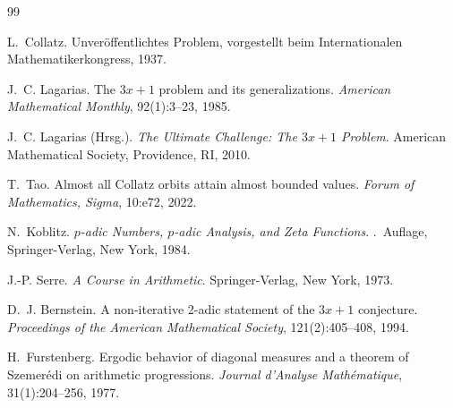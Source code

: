 \documentclass[12pt,a4paper]{article}
\begin{document}
\begin{thebibliography}{99}

L.~Collatz.
\newblock Unveröffentlichtes Problem, vorgestellt beim Internationalen Mathematikerkongress, 1937.

J.~C. Lagarias.
\newblock The $3x+1$ problem and its generalizations.
\newblock \emph{American Mathematical Monthly}, 92(1):3--23, 1985.

J.~C. Lagarias (Hrsg.).
\newblock \emph{The Ultimate Challenge: The $3x+1$ Problem}.
\newblock American Mathematical Society, Providence, RI, 2010.

T.~Tao.
\newblock Almost all Collatz orbits attain almost bounded values.
\newblock \emph{Forum of Mathematics, Sigma}, 10:e72, 2022.

N.~Koblitz.
\newblock \emph{$p$-adic Numbers, $p$-adic Analysis, and Zeta Functions}.
.\ Auflage, Springer-Verlag, New York, 1984.

J.-P. Serre.
\newblock \emph{A Course in Arithmetic}.
\newblock Springer-Verlag, New York, 1973.

D.~J. Bernstein.
\newblock A non-iterative 2-adic statement of the $3x+1$ conjecture.
\newblock \emph{Proceedings of the American Mathematical Society}, 121(2):405--408, 1994.

H.~Furstenberg.
\newblock Ergodic behavior of diagonal measures and a theorem of Szemer\'edi on arithmetic progressions.
\newblock \emph{Journal d'Analyse Math\'ematique}, 31(1):204--256, 1977.

\end{thebibliography}
\end{document}
